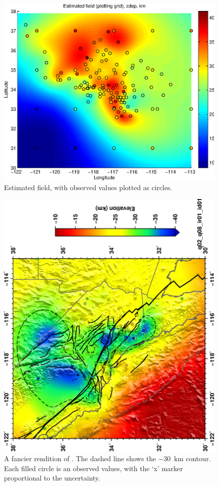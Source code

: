 \documentclass[11pt,titlepage,fleqn]{article}
\begin{document}
\begin{figure}
\includegraphics[width=16cm]{fig1D_8.eps}
\caption[]
{{
Estimated field, with observed values plotted as circles.
\label{fig:fig1D_8}
}}
\end{figure}

\begin{figure}
\includegraphics[width=13cm,angle=-90]{socal_moho03_q02_q08.eps}
\caption[]
{{
A fancier rendition of . The dashed line shows the $-30$~km contour.
Each filled circle is an observed values, with the `x' marker proportional to the uncertainty.
\label{fig:socal_moho}
}}
\end{figure}

\end{document}
